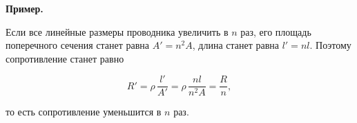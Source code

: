 \documentclass[12pt, a4paper]{article}%
\begin{document}
\textbf{Пример.}

Если все линейные размеры проводника увеличить в $n$ раз, его площадь поперечного сечения станет равна $A' = n^2A$, длина станет равна $l' = nl$. Поэтому сопротивление станет равно


\[
R' =\rho\,\frac{l'}{A'} = \rho\, \frac{nl}{n^2A} = \frac{R}{n},
\]

то есть сопротивление уменьшится в $n$ раз.
\end{document}
